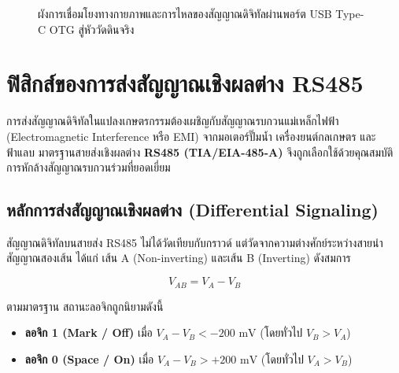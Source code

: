 \begin{figure}[H]
\caption{ผังการเชื่อมโยงทางกายภาพและการไหลของสัญญาณดิจิทัลผ่านพอร์ต USB Type-C OTG สู่หัววัดดินจริง}
\label{fig:ch02_hardware_interconnect}
\end{figure}

\section{ฟิสิกส์ของการส่งสัญญาณเชิงผลต่าง RS485}

การส่งสัญญาณดิจิทัลในแปลงเกษตรกรรมต้องเผชิญกับสัญญาณรบกวนแม่เหล็กไฟฟ้า (Electromagnetic Interference หรือ EMI) จากมอเตอร์ปั๊มน้ำ เครื่องยนต์กลเกษตร และฟ้าแลบ มาตรฐานสายส่งเชิงผลต่าง \textbf{RS485 (TIA/EIA-485-A)} จึงถูกเลือกใช้ด้วยคุณสมบัติการหักล้างสัญญาณรบกวนร่วมที่ยอดเยี่ยม

\subsection{หลักการส่งสัญญาณเชิงผลต่าง (Differential Signaling)}
สัญญาณดิจิทัลบนสายส่ง RS485 ไม่ได้วัดเทียบกับกราวด์ แต่วัดจากความต่างศักย์ระหว่างสายนำสัญญาณสองเส้น ได้แก่ เส้น A (Non-inverting) และเส้น B (Inverting) ดังสมการ

\begin{equation}
V_{AB} = V_A - V_B
\end{equation}

ตามมาตรฐาน สถานะลอจิกถูกนิยามดังนี้
\begin{itemize}
    \item \textbf{ลอจิก 1 (Mark / Off)} เมื่อ $V_A - V_B < -200 \text{ mV}$ (โดยทั่วไป $V_B > V_A$)
    \item \textbf{ลอจิก 0 (Space / On)} เมื่อ $V_A - V_B > +200 \text{ mV}$ (โดยทั่วไป $V_A > V_B$)
\end{itemize}

